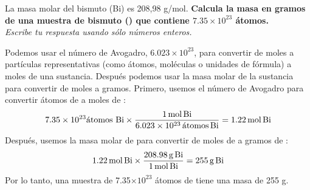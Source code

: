 La masa molar del bismuto (Bi) es 208,98 g/mol.
\textbf{Calcula la masa en gramos de una muestra de bismuto () que contiene $7.35 \times 10^{23}$ átomos.}\\
\emph{Escribe tu respuesta usando sólo números enteros.}


\begin{solutionbox}{6cm}
    Podemos usar el número de Avogadro, $6.023\times 10^{23}$, para convertir de moles a partículas representativas (como átomos, moléculas o unidades de fórmula) a moles de una sustancia. Después podemos usar la masa molar de la sustancia para convertir de moles a gramos.
    Primero, usemos el número de Avogadro para convertir átomos de  a moles de :
    \[7.35\times 10^{23} \text{átomos Bi}\times\frac{1\,\text{mol\,Bi}}{6.023\times 10^{23}\,\text{átomos\,Bi}}=1.22\,\text{mol\,Bi} \]
    Después, usemos la masa molar de  para convertir de moles de  a gramos de :
    \[1.22\,\text{mol\,Bi}\times\frac{208.98\,\text{g\,Bi}}{1\,\text{mol\,Bi}}=255\,\text{g\,Bi} \]
    Por lo tanto, una muestra de 7.35$\times 10^{23}$ átomos de  tiene una masa de 255 g.
\end{solutionbox}